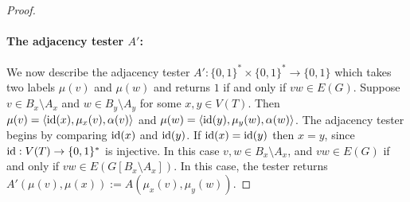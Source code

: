 \begin{proof}
  \paragraph{\boldmath The adjacency tester $A'$:} We now describe the adjacency tester $A':\{0,1\}^*\times\{0,1\}^*\to\{0,1\}$ which takes two labels $\mu(v)$ and $\mu(w)$ and returns $1$ if and only if $vw\in E(G)$.  Suppose $v\in B_x\setminus A_x$ and $w\in B_y\setminus A_y$ for some $x,y\in V(T)$.  Then $\mu(v)=\langle \operatorname{id}(x), \mu_x(v), \alpha(v)\rangle$ and $\mu(w)=\langle \operatorname{id}(y), \mu_y(w), \alpha(w)\rangle$.  The adjacency tester begins by comparing $\operatorname{id}(x)$ and $\operatorname{id}(y)$.  If $\operatorname{id}(x)=\operatorname{id}(y)$ then $x=y$, since $\operatorname{id}:V(T)\to\{0,1\}^*$ is injective.  In this case $v,w\in B_x\setminus A_x$,  and $vw\in E(G)$ if and only if $vw\in E(G[B_x\setminus A_x])$.  In this case, the tester returns $A'(\mu(v),\mu(x)):=A(\mu_x(v),\mu_y(w))$.  
  

\end{proof}
